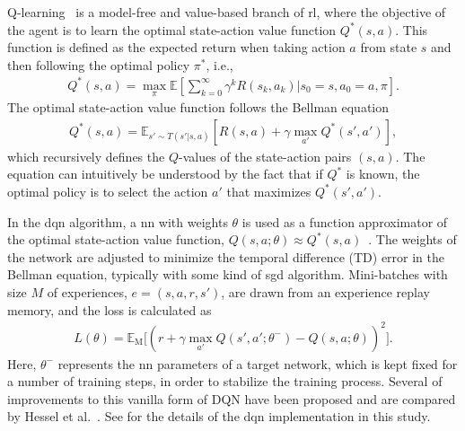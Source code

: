 Q-learning~\cite{Watkins1992} is a model-free and value-based branch of \gls{rl}, where the objective of the agent is to learn the optimal state-action value function $Q^*(s,a)$. This function is defined as the expected return when taking action $a$ from state $s$ and then following the optimal policy $\pi^*$, i.e.,
%
\begin{align}
     Q^*(s,a) = \max_\pi \mathbb{E} \left[ \sum_{k=0}^\infty \gamma^k R(s_k, a_k) | s_0 = s, a_0 = a, \pi\right].
\end{align}
The optimal state-action value function follows the Bellman equation
\begin{align}
    Q^*(s,a) = \mathbb{E}_{s' \sim T(s'|s,a)}\left[R(s,a) + \gamma \max_{a'} Q^*(s',a')\right],
\end{align}
%
which recursively defines the $Q$-values of the state-action pairs $(s,a)$. The equation can intuitively be understood by the fact that if $Q^*$ is known, the optimal policy is to select the action $a'$ that maximizes $Q^*(s',a')$.

In the \gls{dqn} algorithm, a \gls{nn} with weights $\theta$ is used as a function approximator of the optimal state-action value function, $Q(s,a;\theta) \approx Q^*(s,a)$~\cite{Mnih2015}. The weights of the network are adjusted to minimize the temporal difference (TD) error in the Bellman equation, typically with some kind of \gls{sgd} algorithm. Mini-batches with size $M$ of experiences, $e=(s,a,r,s')$, are drawn from an experience replay memory, and the loss is calculated as
%
\begin{align}
    L(\theta) = \mathbb{E}_\mathrm{M} \Big[ (r + \gamma \max_{a'} Q(s',a';\theta^-)
    - Q(s,a;\theta) )^2 \Big].
    \label{eq:lossDQN}
\end{align}
%
Here, $\theta^-$ represents the \gls{nn} parameters of a target network, which is kept fixed for a number of training steps, in order to stabilize the training process. 
Several of improvements to this vanilla form of DQN have been proposed and are compared by Hessel et al.~\cite{Hessel2018}.
See \paperLSTM for the details of the \gls{dqn} implementation in this study.